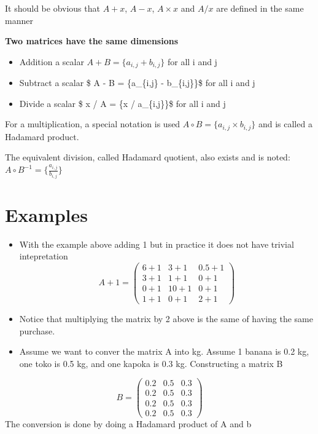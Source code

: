 \documentclass[
  letterpaper,
  DIV=11,
  numbers=noendperiod]{scrreprt}
\providecommand{\tightlist}{%
  \setlength{\itemsep}{0pt}\setlength{\parskip}{0pt}}
\begin{document}
It should be obvious that \(A + x\), \(A - x\), \(A \times x\) and
\(A / x\) are defined in the same manner

\textbf{Two matrices have the same dimensions}

\begin{itemize}
\tightlist
\item
  Addition a scalar \(A  + B =  \{a_{i,j} + b_{i,j}\}\) for all i and j
\item
  Subtract a scalar \$ A - B = \{a\_\{i,j\} - b\_\{i,j\}\}\$ for all i
  and j
\item
  Divide a scalar \$ x / A = \{x / a\_\{i,j\}\}\$ for all i and j
\end{itemize}

For a multiplication, a special notation is used
\(A  \circ B =  \{a_{i,j} \times b_{i,j}\}\) and is called a Hadamard
product.

The equivalent division, called Hadamard quotient, also exists and is
noted: \(A  \circ B^{-1} =  \{\frac{a_{i,j}}{b_{i,j}}\}\)

\section*{Examples}\label{examples-5}


\begin{itemize}
\item
  With the example above adding 1 but in practice it does not have
  trivial intepretation \[
  A + 1 =
  \begin{pmatrix}
    6 + 1 & 3 + 1 & 0.5 + 1\\
    3 + 1 & 1 + 1 & 0 + 1 \\
    0 + 1 & 10 + 1 & 0 + 1\\
    1 + 1 & 0 + 1 & 2 + 1
  \end{pmatrix}
  \]
\item
  Notice that multiplying the matrix by 2 above is the same of having
  the same purchase.
\item
  Assume we want to conver the matrix A into kg. Assume 1 banana is 0.2
  kg, one toko is 0.5 kg, and one kapoka is 0.3 kg. Constructing a
  matrix B
\end{itemize}

\[
B =
\begin{pmatrix}
    0.2 & 0.5 & 0.3 \\
    0.2 & 0.5 & 0.3 \\
    0.2 & 0.5 & 0.3 \\
    0.2 & 0.5 & 0.3
\end{pmatrix}
\] The conversion is done by doing a Hadamard product of A and b
\end{document}
